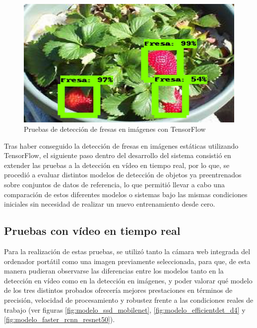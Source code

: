 \begin{figure}[H]
\begin{minipage}{0.45\textwidth}
  \end{minipage}
  \hspace{2mm}
  \begin{minipage}{0.45\textwidth}
    \centering
    \includegraphics[width=\linewidth]{figs/1000.jpeg}
  \end{minipage}
  \caption{Pruebas de detección de fresas en imágenes con TensorFlow}
  \label{fig:Deteccion_Fresas_Imagenes_TF}
  \end{figure}

Tras haber conseguido la detección de fresas en imágenes estáticas utilizando TensorFlow, el siguiente paso dentro del desarrollo del sistema consistió en extender las pruebas a la detección en vídeo en tiempo real, por lo que, se procedió a evaluar distintos modelos de detección de objetos ya preentrenados sobre conjuntos de datos de referencia, lo que permitió llevar a cabo una comparación de estos diferentes modelos o sistemas bajo las mismas condiciones iniciales sin necesidad de realizar un nuevo entrenamiento desde cero. 

\subsection{Pruebas con vídeo en tiempo real}
\label{sec:Pruebas_video_TF}

Para la realización de estas pruebas, se utilizó tanto la cámara web integrada del ordenador portátil como una imagen previamente seleccionada, para que, de esta manera pudieran observarse las diferencias entre los modelos tanto en la detección en vídeo como en la detección en imágenes, y poder valorar qué modelo de los tres distintos probados ofrecería mejores prestaciones en términos de precisión, velocidad de procesamiento y robustez frente a las condiciones reales de trabajo (ver figuras  \ref{fig:modelo_ssd_mobilenet}, \ref{fig:modelo_efficientdet_d4} y \ref{fig:modelo_faster_rcnn_resnet50}). 

